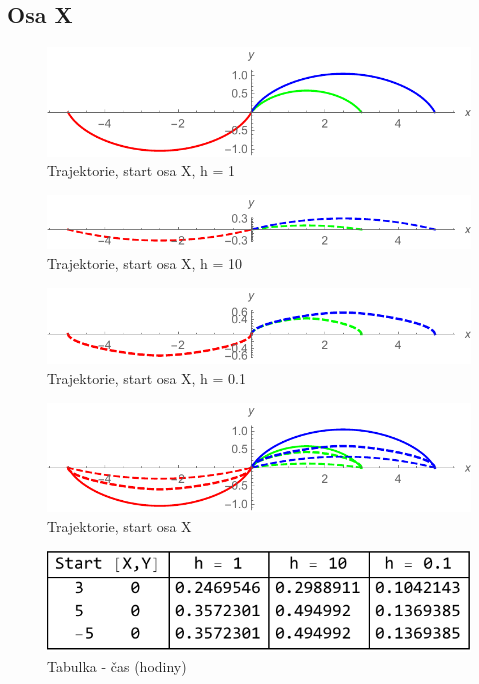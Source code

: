 \documentclass[reqno, a4paper]{amsart}
\numberwithin{equation}{section}
\begin{document}
\subsection{Osa X}
\label{sec: OsaX}

\begin{figure}
\includegraphics[scale=0.7]{figures/OsaX2.pdf}
\caption{Trajektorie, start osa X, h = 1}
\label{Xtraj1}
\end{figure}
\begin{figure}
\includegraphics[scale=0.7]{figures/OsaX3.pdf}
\caption{Trajektorie, start osa X, h = 10}
\label{Xtraj10}
\end{figure}
\begin{figure}
\includegraphics[scale=0.7]{figures/OsaX4.pdf}
\caption{Trajektorie, start osa X, h = 0.1}
\label{Xtraj0.1}
\end{figure}
\begin{figure}
\includegraphics[scale=0.7]{figures/OsaX1.pdf}
\caption{Trajektorie, start osa X}
\label{Xtraj}
\end{figure}
\begin{figure}
\includegraphics[scale=0.7]{figures/OsaX - tab. čas.pdf}
\caption{Tabulka - čas (hodiny)}
\label{TabX1}
\end{figure}
\end{document}
